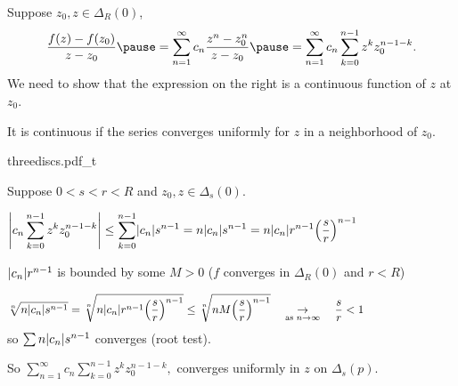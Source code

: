 \documentclass[10pt,aspectratio=169]{beamer}
\begin{document}
\begin{frame}

Suppose $z_0,z \in \Delta_R(0)$,
\[
\frac{f(z) - f(z_0)}{z-z_0}
\pause
=
\sum_{n=1}^\infty c_n \frac{z^n-z_0^n}{z-z_0}
\pause
=
\sum_{n=1}^\infty c_n \sum_{k=0}^{n-1} z^k z_0^{n-1-k} .
\]
\pause
We need to show that the expression on the right is a continuous
function of $z$ at $z_0$.

\pause

It is continuous if the series
converges uniformly for $z$ in a
neighborhood of $z_0$.

\pause

\hspace*{\fill}
{threediscs.pdf_t}

\vspace*{-1.47in}
Suppose $0 < s < r < R$ and $z_0,z \in \Delta_s(0)$.

\pause

\[
\left\lvert {c_n \sum_{k=0}^{n-1} z^k z_0^{n-1-k}} \right\rvert
\leq
\sum_{k=0}^{n-1} 
\lvert {c_n} \rvert s^{n-1}
=
n
\lvert {c_n} \rvert s^{n-1}
=
n
\lvert {c_n} \rvert r^{n-1} {\left(\frac{s}{r}\right)}^{n-1}
\qquad
\qquad
\qquad
\qquad
\]

\pause

$\lvert {c_n} \rvert r^{n-1}$ is bounded by some $M > 0$
($f$ converges in
$\Delta_{R}(0)$ and $r < R$)
\pause

\[
\sqrt[n]{
n \lvert {c_n} \rvert s^{n-1}
}
=
\sqrt[n]{
n \lvert {c_n} \rvert r^{n-1} {\left(\frac{s}{r}\right)}^{n-1}
}
\leq
\sqrt[n]{
n M {\left(\frac{s}{r}\right)}^{n-1}
}
\quad\underset{\text{as } n \to \infty}{\to}\quad
\frac{s}{r} < 1
\qquad
\qquad
\qquad
\qquad
\]
\pause
so
$\sum n \lvert {c_n} \rvert s^{n-1}$
converges (root test).

\pause

So
\(
\sum_{n=1}^\infty c_n \sum_{k=0}^{n-1} z^k z_0^{n-1-k} ,
\)
converges uniformly in $z$ on $\Delta_s(p)$.

\end{frame}
\end{document}
